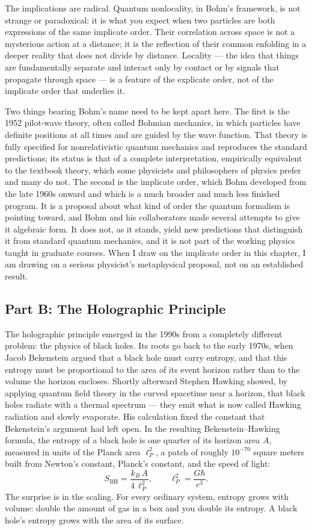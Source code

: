 The implications are radical.
Quantum nonlocality, in Bohm's framework, is not strange or paradoxical: it is what you expect when two particles are both expressions of the same implicate order.
Their correlation across space is not a mysterious action at a distance; it is the reflection of their common enfolding in a deeper reality that does not divide by distance.
Locality --- the idea that things are fundamentally separate and interact only by contact or by signals that propagate through space --- is a feature of the explicate order, not of the implicate order that underlies it.

Two things bearing Bohm's name need to be kept apart here.
The first is the 1952 pilot-wave theory, often called Bohmian mechanics, in which particles have definite positions at all times and are guided by the wave function.
That theory is fully specified for nonrelativistic quantum mechanics and reproduces the standard predictions; its status is that of a complete interpretation, empirically equivalent to the textbook theory, which some physicists and philosophers of physics prefer and many do not.
The second is the implicate order, which Bohm developed from the late 1960s onward and which is a much broader and much less finished program.
It is a proposal about what kind of order the quantum formalism is pointing toward, and Bohm and his collaborators made several attempts to give it algebraic form.
It does not, as it stands, yield new predictions that distinguish it from standard quantum mechanics, and it is not part of the working physics taught in graduate courses.
When I draw on the implicate order in this chapter, I am drawing on a serious physicist's metaphysical proposal, not on an established result.

\subsection*{Part B: The Holographic Principle}

The holographic principle emerged in the 1990s from a completely different problem: the physics of black holes.
Its roots go back to the early 1970s, when Jacob Bekenstein argued that a black hole must carry entropy, and that this entropy must be proportional to the area of its event horizon rather than to the volume the horizon encloses.
Shortly afterward Stephen Hawking showed, by applying quantum field theory in the curved spacetime near a horizon, that black holes radiate with a thermal spectrum --- they emit what is now called Hawking radiation and slowly evaporate.
His calculation fixed the constant that Bekenstein's argument had left open.
In the resulting Bekenstein--Hawking formula, the entropy of a black hole is one quarter of its horizon area $A$, measured in units of the Planck area $\ell_P^{2}$, a patch of roughly $10^{-70}$ square meters built from Newton's constant, Planck's constant, and the speed of light:
\[
S_{\mathrm{BH}} = \frac{k_B\, A}{4\,\ell_P^{2}}, \qquad \ell_P^{2} = \frac{G\hbar}{c^{3}}.
\]
The surprise is in the scaling.
For every ordinary system, entropy grows with volume: double the amount of gas in a box and you double its entropy.
A black hole's entropy grows with the area of its surface.

